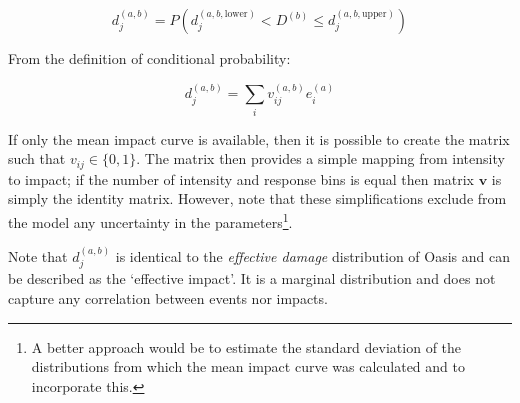 \documentclass{article}
\begin{document}
\begin{equation}
    \label{Eq:impact}
    d^{(a,b)}_j = P \left( d^{(a,b,\text{lower})}_j < D^{(b)} \le d^{(a,b,\text{upper})}_j \right)
\end{equation}

From the definition of conditional probability:

\begin{equation}
    \label{Eq:model}
    d^{(a,b)}_j = \sum_{i} v^{(a,b)}_{ij} e^{(a)}_i
\end{equation}

If only the mean impact curve is available, then it is possible to create the matrix such that $v_{ij} \in \{0, 1\}$. The matrix then provides a simple mapping from intensity to impact; if the number of intensity and response bins is equal then matrix $\mathbf{v}$ is simply the identity matrix. However, note that these simplifications exclude from the model any uncertainty in the parameters\footnote{A better approach would be to estimate the standard deviation of the distributions from which the mean impact curve was calculated and to incorporate this.}.

Note that $d^{(a,b)}_j$ is identical to the {\it effective damage} distribution of Oasis and can be described as the `effective impact'. It is a marginal distribution and does not capture any correlation between events nor impacts.
\end{document}
